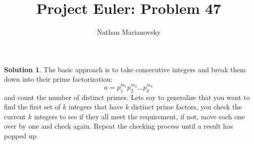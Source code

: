 \documentclass[12pt, letterpaper, onecolumn, conference, final]{IEEEtran}
\title{Project Euler: Problem 47}
\author{Nathan Marianovsky}
\theoremstyle{definition}
\newtheorem*{problem*}{Problem}
\newtheorem*{solution*}{Solution}
\theoremstyle{plain}
\begin{document}
\maketitle

\begin{center}
\end{center}

\vspace{.3cm}
\begin{solution*}
The basic approach is to take consecutive integers and break them down into their prime factorization:
\begin{equation*}
a = p_1^{m_1} p_2^{m_2} \dots p_k^{m_k}
\end{equation*}
and count the number of distinct primes. Lets say to generalize that you want to find the first set of $k$ integers that have $k$ distinct prime factors, you check the current $k$ integers to see if they all meet the requirement, if not, move each one over by one and check again. Repeat the checking process until a result has popped up.
\end{solution*}
\end{document}
